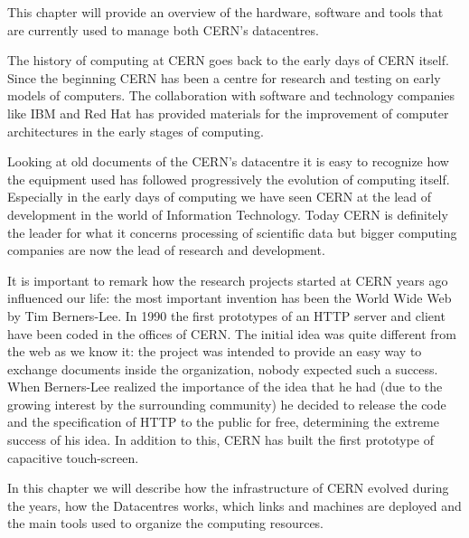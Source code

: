 This chapter will provide an overview of the hardware, software and tools
that are currently used to manage both CERN's datacentres.

The history of computing at CERN goes back to the early days of CERN
itself. Since the beginning CERN has been a centre for research and
testing on early models of computers. The collaboration with software and
technology companies like IBM \cite{IBMWebsite} and Red Hat
\cite{RedHatWebsite} has provided materials for the improvement of
computer architectures in the early stages of computing.

Looking at old documents of the CERN's datacentre it is easy to recognize
how the equipment used has followed progressively the evolution of
computing itself. Especially in the early days of computing we have seen
CERN at the lead of development in the world of Information Technology.
Today CERN is definitely the leader for what it concerns processing of
scientific data but bigger computing companies are now the lead of
research and development.

It is important to remark how the research projects started at CERN years
ago influenced our life: the most important invention has been the World
Wide Web by Tim Berners-Lee. In 1990 the first prototypes of an HTTP
server and client have been coded in the offices of CERN. The initial idea
was quite different from the web as we know it: the project was intended
to provide an easy way to exchange documents inside the organization,
nobody expected such a success. When Berners-Lee realized the importance
of the idea that he had (due to the growing interest by the surrounding
community) he decided to release the code and the specification of HTTP to
the public for free, determining the extreme success of his idea. In
addition to this, CERN has built the first prototype of capacitive
touch-screen.

In this chapter we will describe how the infrastructure of CERN evolved
during the years, how the Datacentres works, which links and machines
are deployed and the main tools used to organize the computing resources.
